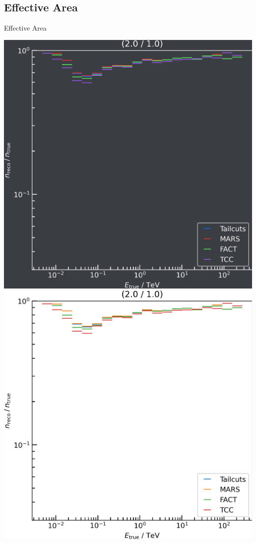\subsection{Effective Area}
\begin{frame}{Effective Area}
  \begin{minipage}{0.32\textwidth}
    \ifdefined\darktheme
      \centering
      \includegraphics[width=\textwidth]{plots/effective_area/aeff_2.0_1.0_dark.png}
    \else
      \centering
      \includegraphics[width=\textwidth]{plots/effective_area/aeff_2.0_1.0_light.png}

\end{minipage}
\end{frame}
